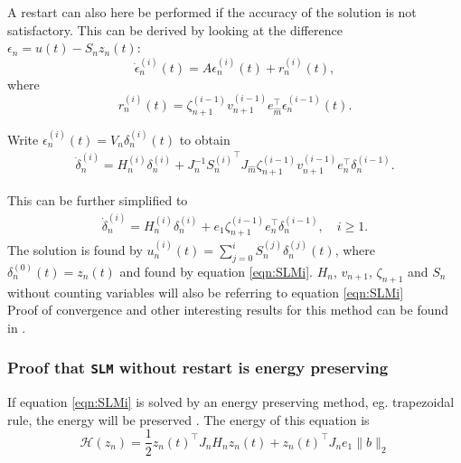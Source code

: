 A restart can also here be performed if the accuracy of the solution is not satisfactory. This can be derived by looking at the difference $ \epsilon_n = u(t) - S_n z_n(t)$: %
\begin{equation*}
\dot{\epsilon}_n^{(i)}(t) = A \epsilon_n^{(i)}(t) + r_n^{(i)}(t),
\label{eqn:resenerg}
\end{equation*}
where
\begin{equation*}
r_n^{(i)}(t) = \zeta_{n+1}^{(i-1)} v_{n+1}^{(i-1)} e_{\hat{m}}^\top \epsilon_n^{(i-1)}(t).
\end{equation*}

Write $ \epsilon^{(i)}_n(t)  = V_n \delta_n^{(i)}(t) $ to obtain
\begin{equation*}
\begin{aligned}
\dot{\delta}_n^{(i)} = H_n^{(i)} \delta_n^{(i)} + J^{-1}_n {S_n^{(i)}}^\top J_{\hat{m}} \zeta_{n+1}^{(i-1)}v_{n+1}^{(i-1)} e_n^\top \delta_n^{(i-1)}.
\end{aligned}
\end{equation*}

This can be further simplified to
\begin{equation*}
\begin{aligned}
\dot{\delta}_n^{(i)} = H_n^{(i)} \delta_n^{(i)} + e_1 \zeta_{n+1}^{(i-1)} e_n^\top \delta_n^{(i-1)}, \quad i \geq 1.
\label{eqn:SLMr}
\end{aligned}
\end{equation*}
The solution is found by $ u_n^{(i)}(t) = \sum \limits_{j = 0} ^i S_n^{(j)} \delta_n^{(j)} (t) $, where $\delta_n^{(0)} (t) = z_n(t)$ and found by equation \eqref{eqn:SLMi}. $H_n$, $v_{n+1}$, $\zeta_{n+1}$ and $S_n$ without counting variables will also be referring to equation \eqref{eqn:SLMi} \\

Proof of convergence and other interesting results for this method can be found in \cite{SLMinteresting}. 

\subsubsection{Proof that \texttt{SLM} without restart is energy preserving} %
If equation \eqref{eqn:SLMi} is solved by an energy preserving method, eg. trapezoidal rule, the energy will be preserved \cite{SLMpreserve}. The energy of this equation is
\begin{equation*}
\mathcal{H}(z_n) = \frac{1}{2}z_n(t)^\top J_n H_n z_n(t) + z_n(t)^\top J_n e_1 \|b \|_2
\end{equation*}

